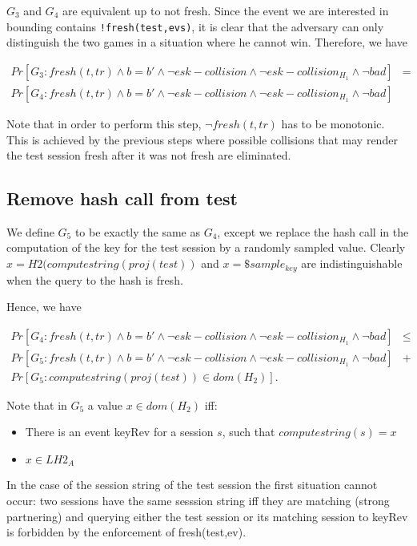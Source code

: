 \documentclass[]{article}
\begin{document}
$G_3$ and $G_4$ are equivalent  up to not fresh. Since the event we are interested in bounding contains \verb+!fresh(test,evs)+, it is clear that the adversary can only distinguish the two games in a situation where he cannot win. Therefore, we have

\begin{align*}
Pr[G_3 : fresh(t,tr) \land b = b' \land \neg esk-collision \land \neg esk-collision_{H_1} \land \neg bad] &=&\\
  Pr[G_4 : fresh(t,tr) \land b = b' \land \neg esk-collision \land \neg esk-collision_{H_1} \land \neg bad] 
\end{align*}

Note that in order to perform this step, $\neg fresh(t,tr)$ has to be monotonic. This is achieved by the previous steps where possible collisions that may render the test session fresh after it was not fresh are eliminated.

\subsection{Remove hash call from test}
We define $G_5$ to be exactly the same as $G_4$, except we replace the hash call in the computation of the key for the test session by a randomly sampled value. Clearly $x = H2(computestring(proj(test))$ and $x=\$sample_{key} $ are  indistinguishable when the query to the hash is fresh. 

Hence, we have

\begin{align*}
  Pr[G_4 : fresh(t,tr) \land b = b' \land \neg esk-collision \land \neg esk-collision_{H_1} \land \neg bad]  &\leq&\\ 
  Pr[G_5 : fresh(t,tr) \land b = b' \land \neg esk-collision \land \neg esk-collision_{H_1} \land \neg bad]  &+&\\
  Pr[G_5 : computestring(proj(test)) \in dom(H_2) ]. 
\end{align*}


Note that  in $G_5$ a value $x\in dom(H_2)$ iff:
\begin{itemize}
\item There is an event keyRev for a session $s$, such that $computestring(s) = x$
\item $x \in LH2_{A}$
\end{itemize}

In the case of the session string of the test session the first situation cannot occur: two sessions have the same sesssion string iff they are matching (strong partnering) and querying either the test session or its matching session to keyRev is forbidden by the enforcement of fresh(test,ev).
\end{document}
